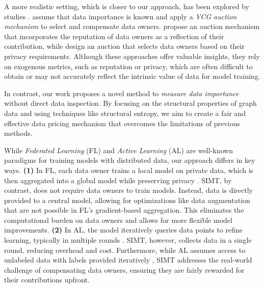 
A more realistic setting, which is closer to our approach, has been explored by studies \cite{cong2020vcg,zhang2021incentive,sun2022profit}. \cite{cong2020vcg} assume that data importance is known and apply a \emph{VCG auction mechanism} to select and compensate data owners. \cite{zhang2021incentive} propose an auction mechanism that incorporates the reputation of data owners as a reflection of their contribution, while \cite{sun2022profit} design an auction that selects data owners based on their privacy requirements. Although these approaches offer valuable insights, they rely on exogenous metrics, such as reputation or privacy, which are often difficult to obtain or may not accurately reflect the intrinsic value of data for model training.

In contrast, our work proposes a novel method to \emph{measure data importance} without direct data inspection. By focusing on the structural properties of graph data and using techniques like structural entropy, we aim to create a fair and effective data pricing mechanism that overcomes the limitations of previous methods.



 While {\em Federated Learning} (FL) and {\em Active Learning} (AL) are well-known paradigms for training models with distributed data, our approach differs in key ways.
{\bf (1)} In FL, each data owner trains a local model on private data, which is then aggregated into a global model while preserving privacy \cite{zhang2021survey}. SIMT, by contrast, does not require data owners to train models. Instead, data is directly provided to a central model, allowing for optimizations like data augmentation that are not possible in FL's gradient-based aggregation. This eliminates the computational burden on data owners and allows for more flexible model improvements. {\bf (2)} In AL, the model iteratively queries data points to refine learning, typically in multiple rounds \cite{ren2021survey}. SIMT, however, collects data in a single round, reducing overhead and cost. Furthermore, while AL assumes access to unlabeled data with labels provided iteratively \cite{cai2017active,zhang2021alg}, SIMT addresses the real-world challenge of compensating data owners, ensuring they are fairly rewarded for their contributions upfront.